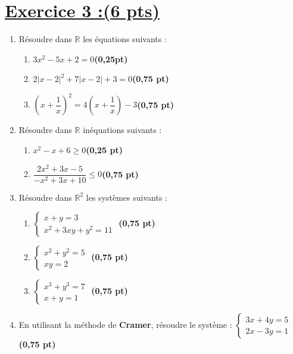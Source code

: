 \documentclass[12pt,a4paper]{article}
\begin{document}
\section*{\underline{Exercice 3 :(6 pts)} }
\begin{enumerate}
    \item Résoudre dans $\mathbb{R}$ les équations suivants :
    \begin{enumerate}
    \item $3x^2 - 5x + 2 = 0$\hfill \textbf{(0,25pt)}
    \item $2|x - 2|^2 + 7|x - 2| + 3 = 0$\hfill \textbf{(0,75 pt)}
    \item $\left(x + \dfrac{1}{x}\right)^2 = 4\left(x + \dfrac{1}{x}\right) - 3$\hfill \textbf{(0,75 pt)}
    \end{enumerate}
    \item Résoudre dans $\mathbb{R}$ inéquations suivants :
   \begin{enumerate}
     \item $x^2 - x + 6 \geq 0$\hfill \textbf{(0,25 pt)}
     \item $\dfrac{2x^2 + 3x - 5}{-x^2 + 3x + 10} \leq 0$\hfill \textbf{(0,75 pt)}
   \end{enumerate} 
        \item Résoudre dans $\mathbb{R}^2$ les systèmes suivants :
    \begin{enumerate}
    \item $\begin{cases} x + y = 3 \\ x^2 + 3xy + y^2 = 11 \end{cases}$ \hfill \textbf{(0,75 pt)}
    \item $\begin{cases} x^2 + y^2 = 5 \\ xy = 2 \end{cases}$ \hfill \textbf{(0,75 pt)}
    \item $\begin{cases} x^3 + y^3 = 7 \\ x + y = 1 \end{cases}$ \hfill \textbf{(0,75 pt)}
    \end{enumerate}
    \item En utilisant la méthode de \textbf{Cramer}, résoudre le système : 
    $\begin{cases} 3x + 4y = 5 \\ 2x - 3y = 1 \end{cases}$ \hfill \textbf{(0,75 pt)}
\end{enumerate}
\end{document}

